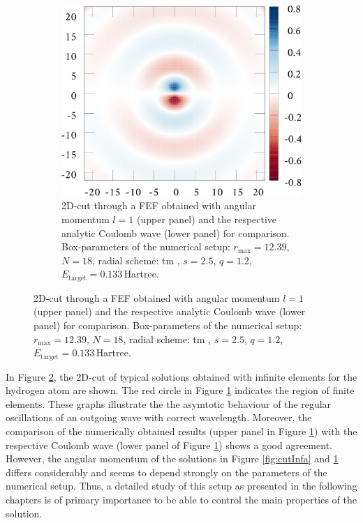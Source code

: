 \begin{figure}
\begin{subfigure}{0.47\textwidth}
   \includegraphics[width=\textwidth]{Figures/RBF/P-Wave}
   \caption{2D-cut through a FEF obtained with angular momentum $l=1$ (upper panel) and the respective analytic Coulomb wave (lower panel) for comparison.
   Box-parameters of the numerical setup: $r_\text{max}=12.39$, $N=18$, radial scheme: tm , $s=2.5$, $q=1.2$, $E_\text{target}=0.133\,$Hartree.}
   \label{fig:cutInfb}
\end{subfigure}
\label{fig:cutInf}
\end{figure}
In Figure \ref{fig:cutInf}, the 2D-cut of typical solutions obtained with infinite elements for the hydrogen atom are shown.
The red circle in Figure \ref{fig:cutInfb} indicates the region of finite elements.
These graphs illustrate the the asymtotic behaviour of the regular oscillations of an outgoing wave with correct wavelength.
Moreover, the comparison of the numerically obtained results (upper panel in Figure \ref{fig:cutInfb}) with the respective Coulomb wave (lower panel of Figure \ref{fig:cutInfb}) shows a good agreement.
However, the angular momentum of the solutions in Figure \ref{fig:cutInfa} and \ref{fig:cutInfb} differs considerably and seems to depend strongly on the parameters of the numerical setup.
Thus, a detailed study of this setup as presented in the following chapters is of primary importance to be able to control the main properties of the solution.

